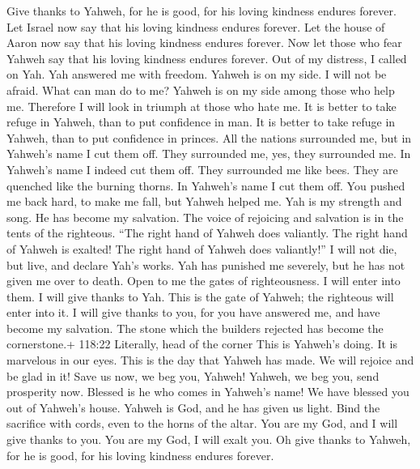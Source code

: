  Give thanks to Yahweh, for he is good, for his loving
kindness endures forever.  Let Israel now say that his
loving kindness endures forever.  Let the house of Aaron now
say that his loving kindness endures forever.  Now let those
who fear Yahweh say that his loving kindness endures forever.
 Out of my distress, I called on Yah. Yah answered me with
freedom.  Yahweh is on my side. I will not be afraid. What
can man do to me?  Yahweh is on my side among those who help
me. Therefore I will look in triumph at those who hate me. 
It is better to take refuge in Yahweh, than to put confidence in man.
 It is better to take refuge in Yahweh, than to put
confidence in princes.  All the nations surrounded me, but
in Yahweh's name I cut them off.  They surrounded me, yes,
they surrounded me. In Yahweh's name I indeed cut them off.
 They surrounded me like bees. They are quenched like the
burning thorns. In Yahweh's name I cut them off.  You
pushed me back hard, to make me fall, but Yahweh helped me.
 Yah is my strength and song. He has become my salvation.
 The voice of rejoicing and salvation is in the tents of
the righteous. ``The right hand of Yahweh does valiantly. 
The right hand of Yahweh is exalted! The right hand of Yahweh does
valiantly!''  I will not die, but live, and declare Yah's
works.  Yah has punished me severely, but he has not given
me over to death.  Open to me the gates of righteousness. I
will enter into them. I will give thanks to Yah.  This is
the gate of Yahweh; the righteous will enter into it.  I
will give thanks to you, for you have answered me, and have become my
salvation.  The stone which the builders rejected has
become the cornerstone.+ 118:22 Literally, head of the corner
 This is Yahweh's doing. It is marvelous in our eyes.
 This is the day that Yahweh has made. We will rejoice and
be glad in it!  Save us now, we beg you, Yahweh! Yahweh, we
beg you, send prosperity now.  Blessed is he who comes in
Yahweh's name! We have blessed you out of Yahweh's house. 
Yahweh is God, and he has given us light. Bind the sacrifice with cords,
even to the horns of the altar.  You are my God, and I will
give thanks to you. You are my God, I will exalt you.  Oh
give thanks to Yahweh, for he is good, for his loving kindness endures
forever.

